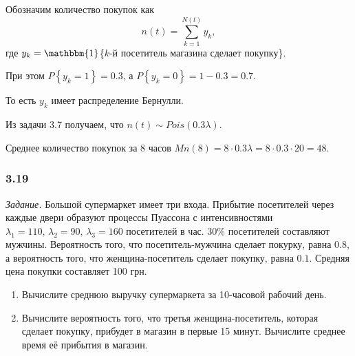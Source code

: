 Обозначим количество покупок как
$$n \left( t \right) =
  \sum \limits_{k = 1}^{N \left( t \right) } y_k,$$
где $y_k = \mathbbm{1}$\{$k$-й посетитель магазина сделает покупку\}.

При этом $P \left\{ y_k = 1 \right\} = 0.3$, а $P \left\{ y_k = 0 \right\} = 1 - 0.3 = 0.7$.

То есть $y_k$ имеет распределение Бернулли.

Из задачи 3.7 получаем, что $n \left( t \right) \sim Pois \left( 0.3 \lambda \right) $.

Среднее количество покупок за 8 часов
$Mn \left( 8 \right) =
  8 \cdot 0.3 \lambda =
  8 \cdot 0.3 \cdot 20 =
  48$.

\subsubsection*{3.19}

\textit{Задание.}
Большой супермаркет имеет три входа.
Прибытие посетителей через каждые двери образуют процессы Пуассона с интенсивностями
$ \lambda_1 = 110, \, \lambda_2 = 90, \, \lambda_3 = 160$ посетителей в час.
30\% посетителей составляют мужчины.
Вероятность того, что посетитель-мужчина сделает покурку, равна $0.8$, а вероятность того,
что женщина-посетитель сделает покупку, равна $0.1$.
Средняя цена покупки составляет 100 грн.
\begin{enumerate}[label=\alph*)]
  \item Вычислите среднюю выручку супермаркета за 10-часовой рабочий день.
  \item Вычислите вероятность того, что третья женщина-посетитель, которая сделает покупку,
  прибудет в магазин в первые 15 минут.
  Вычислите среднее время её прибытия в магазин.
\end{enumerate}

